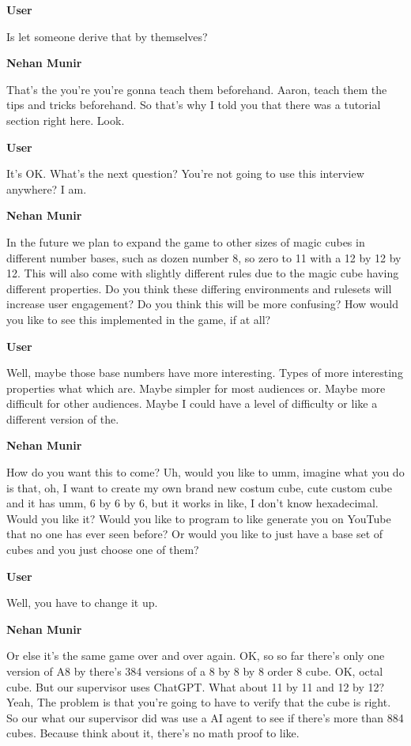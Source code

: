 \documentclass{article}
\begin{document}
\noindent \textbf{User}

Is let someone derive that by themselves?

\noindent \textbf{Nehan Munir}

That's the you're you're gonna teach them beforehand. Aaron, teach them the tips and tricks beforehand. So that's why I told you that there was a tutorial section right here. Look.

\noindent \textbf{User}

It's OK. What's the next question? You're not going to use this interview anywhere? I am.

\noindent \textbf{Nehan Munir}

In the future we plan to expand the game to other sizes of magic cubes in different number bases, such as dozen number 8, so zero to 11 with a 12 by 12 by 12. This will also come with slightly different rules due to the magic cube having different properties. Do you think these differing environments and rulesets will increase user engagement? Do you think this will be more confusing? How would you like to see this implemented in the game, if at all?

\noindent \textbf{User}

Well, maybe those base numbers have more interesting. Types of more interesting properties what which are. Maybe simpler for most audiences or. Maybe more difficult for other audiences. Maybe I could have a level of difficulty or like a different version of the.

\noindent \textbf{Nehan Munir}

How do you want this to come? Uh, would you like to umm, imagine what you do is that, oh, I want to create my own brand new costum cube, cute custom cube and it has umm, 6 by 6 by 6, but it works in like, I don't know hexadecimal. Would you like it? Would you like to program to like generate you on YouTube that no one has ever seen before? Or would you like to just have a base set of cubes and you just choose one of them?

\noindent \textbf{User}

Well, you have to change it up.

\noindent \textbf{Nehan Munir}

Or else it's the same game over and over again. OK, so so far there's only one version of A8 by there's 384 versions of a 8 by 8 by 8 order 8 cube. OK, octal cube. But our supervisor uses ChatGPT. What about 11 by 11 and 12 by 12? Yeah, The problem is that you're going to have to verify that the cube is right. So our what our supervisor did was use a AI agent to see if there's more than 884 cubes. Because think about it, there's no math proof to like.
\end{document}
